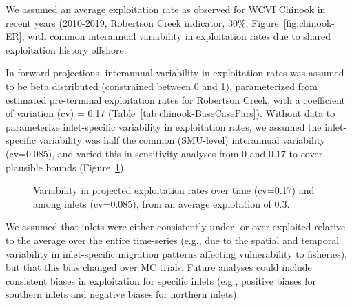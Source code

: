\documentclass[11pt]{book}
\begin{document}
We assumed an average exploitation rate as observed for WCVI Chinook in recent years (2010-2019, Robertson Creek indicator, 30\%, Figure~\ref{fig:chinook-ER}, with common interannual variability in exploitation rates due to shared exploitation history offshore.

In forward projections, interannual variability in exploitation rates was assumed to be beta distributed (constrained between 0 and 1), parameterized from estimated pre-terminal exploitation rates for Robertson Creek, with a coefficient of variation (cv) = 0.17 (Table~\ref{tab:chinook-BaseCasePars}). Without data to parameterize inlet-specific variability in exploitation rates, we assumed the inlet-specific variability was half the common (SMU-level) interannual variability (cv=0.085), and varied this in sensitivity analyses from 0 and 0.17 to cover plausible bounds (Figure~\ref{fig:chinook-ERdist}).
\begin{figure}[htb]

{\centering {} 

}

\caption{Variability in projected exploitation rates over time (cv=0.17) and among inlets (cv=0.085), from an average explotation of 0.3.}\label{fig:chinook-ERdist}
\end{figure}
We assumed that inlets were either consistently under- or over-exploited relative to the average over the entire time-series (e.g., due to the spatial and temporal variability in inlet-specific migration patterns affecting vulnerability to fisheries), but that this bias changed over MC trials. Future analyses could include consistent biases in exploitation for specific inlets (e.g., positive biases for southern inlets and negative biases for northern inlets).
\end{document}
